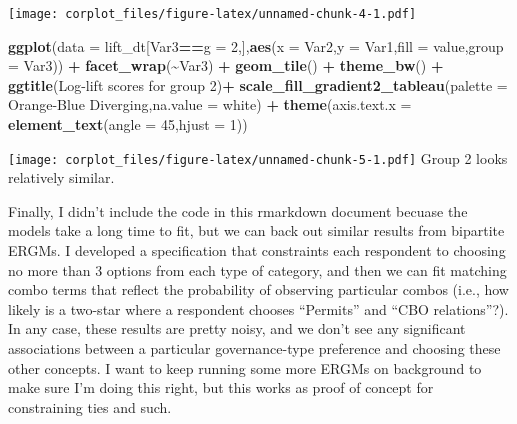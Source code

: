 \documentclass[
]{article}
\newenvironment{Shaded}{\begin{snugshade}}{\end{snugshade}}
\newcommand{\DataTypeTok}[1]{\textcolor[rgb]{0.13,0.29,0.53}{#1}}
\newcommand{\DecValTok}[1]{\textcolor[rgb]{0.00,0.00,0.81}{#1}}
\newcommand{\KeywordTok}[1]{\textcolor[rgb]{0.13,0.29,0.53}{\textbf{#1}}}
\newcommand{\NormalTok}[1]{#1}
\newcommand{\OperatorTok}[1]{\textcolor[rgb]{0.81,0.36,0.00}{\textbf{#1}}}
\newcommand{\StringTok}[1]{\textcolor[rgb]{0.31,0.60,0.02}{#1}}
\begin{document}
\texttt{[image: corplot\_files/figure-latex/unnamed-chunk-4-1.pdf]}

\begin{Shaded}
\begin{Highlighting}[]
\KeywordTok{ggplot}\NormalTok{(}\DataTypeTok{data =}\NormalTok{ lift\_dt[Var3}\OperatorTok{==}\StringTok{\textquotesingle{}g = 2\textquotesingle{}}\NormalTok{,],}\KeywordTok{aes}\NormalTok{(}\DataTypeTok{x =}\NormalTok{ Var2,}\DataTypeTok{y =}\NormalTok{ Var1,}\DataTypeTok{fill =}\NormalTok{ value,}\DataTypeTok{group =}\NormalTok{ Var3)) }\OperatorTok{+}\StringTok{ }\KeywordTok{facet\_wrap}\NormalTok{(}\OperatorTok{\textasciitilde{}}\NormalTok{Var3) }\OperatorTok{+}\StringTok{ }\KeywordTok{geom\_tile}\NormalTok{() }\OperatorTok{+}\StringTok{ }\KeywordTok{theme\_bw}\NormalTok{() }\OperatorTok{+}\StringTok{ }
\StringTok{  }\KeywordTok{ggtitle}\NormalTok{(}\StringTok{\textquotesingle{}Log{-}lift scores for group 2\textquotesingle{}}\NormalTok{)}\OperatorTok{+}
\StringTok{  }\KeywordTok{scale\_fill\_gradient2\_tableau}\NormalTok{(}\DataTypeTok{palette =} \StringTok{\textquotesingle{}Orange{-}Blue Diverging\textquotesingle{}}\NormalTok{,}\DataTypeTok{na.value =} \StringTok{\textquotesingle{}white\textquotesingle{}}\NormalTok{) }\OperatorTok{+}\StringTok{ }\KeywordTok{theme}\NormalTok{(}\DataTypeTok{axis.text.x =} \KeywordTok{element\_text}\NormalTok{(}\DataTypeTok{angle =} \DecValTok{45}\NormalTok{,}\DataTypeTok{hjust =} \DecValTok{1}\NormalTok{))}
\end{Highlighting}
\end{Shaded}

\texttt{[image: corplot\_files/figure-latex/unnamed-chunk-5-1.pdf]} Group
2 looks relatively similar.

Finally, I didn't include the code in this rmarkdown document becuase
the models take a long time to fit, but we can back out similar results
from bipartite ERGMs. I developed a specification that constraints each
respondent to choosing no more than 3 options from each type of
category, and then we can fit matching combo terms that reflect the
probability of observing particular combos (i.e., how likely is a
two-star where a respondent chooses ``Permits'' and ``CBO relations''?).
In any case, these results are pretty noisy, and we don't see any
significant associations between a particular governance-type preference
and choosing these other concepts. I want to keep running some more
ERGMs on background to make sure I'm doing this right, but this works as
proof of concept for constraining ties and such.
\end{document}
